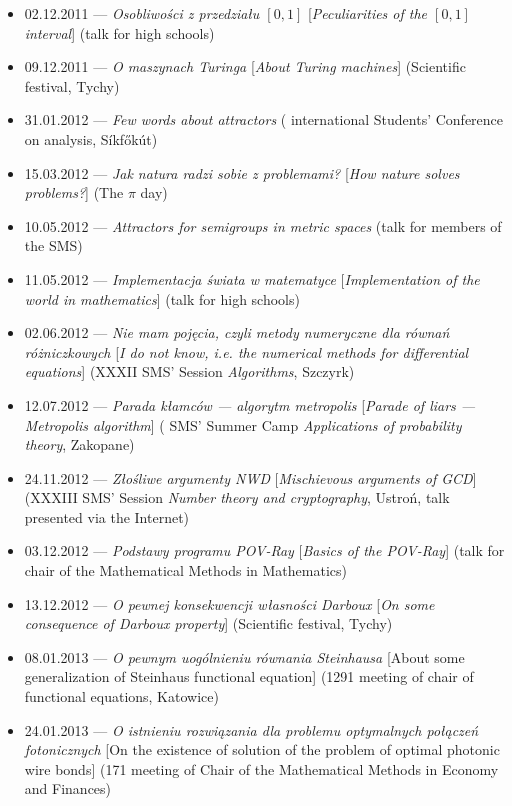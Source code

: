 \begin{itemize}
  \item 02.12.2011 --- \textsl{Osobliwości z przedziału $[0, 1]$} [\textsl{Peculiarities of the $[0,1]$ interval}] (talk for high schools)
  \item 09.12.2011 --- \textsl{O maszynach Turinga} [\textsl{About Turing machines}] (Scientific festival, Tychy)
  \item 31.01.2012 --- \textsl{Few words about attractors} ( international Students' Conference on analysis, Síkfőkút)
  \item 15.03.2012 --- \textsl{Jak natura radzi sobie z problemami?} [\textsl{How nature solves problems?}] (The $\pi$ day)
  \item 10.05.2012 --- \textsl{Attractors for semigroups in metric spaces} (talk for members of the SMS)
  \item 11.05.2012 --- \textsl{Implementacja świata w matematyce} [\textsl{Implementation of the world in mathematics}] (talk for high schools)
  \item 02.06.2012 --- \textsl{Nie mam pojęcia, czyli metody numeryczne dla równań różniczkowych} [\textsl{I do not know, i.e. the numerical methods for differential equations}] (XXXII SMS' Session \textsl{Algorithms}, Szczyrk)
  \item 12.07.2012 --- \textsl{Parada kłamców --- algorytm metropolis} [\textsl{Parade of liars ---  Metropolis algorithm}] ( SMS' Summer Camp \textsl{Applications of probability theory}, Zakopane)
  \item 24.11.2012 --- \textsl{Złośliwe argumenty NWD} [\textsl{Mischievous arguments of GCD}] (XXXIII SMS' Session \textsl{Number theory and cryptography}, Ustroń, talk presented via the Internet)
  \item 03.12.2012 --- \textsl{Podstawy programu POV-Ray} [\textsl{Basics of the POV-Ray}] (talk for chair of the Mathematical Methods in Mathematics)
  \item 13.12.2012 --- \textsl{O pewnej konsekwencji własności Darboux} [\textsl{On some consequence of Darboux property}] (Scientific festival, Tychy)
  \item 08.01.2013 --- \textsl{O pewnym uogólnieniu równania Steinhausa} [About some generalization of Steinhaus functional equation] (1291 meeting of chair of functional equations, Katowice)
  \item 24.01.2013 --- \textsl{O istnieniu rozwiązania dla problemu optymalnych połączeń fotonicznych} [On the existence of solution of the problem of optimal photonic wire bonds] (171 meeting of Chair of the Mathematical Methods in Economy and Finances)

\end{itemize}

